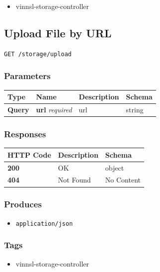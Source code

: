 \begin{itemize}
\tightlist
\item
  vinnsl-storage-controller
\end{itemize}

\subsection{Upload File by URL}\label{upload-file-by-url}

\begin{verbatim}
GET /storage/upload
\end{verbatim}

\subsubsection{Parameters}\label{parameters-19}

\begin{longtable}[]{@{}llll@{}}
\toprule
Type & Name & Description & Schema\tabularnewline
\midrule
\endhead
\textbf{Query} & \textbf{url} \emph{required} & url &
string\tabularnewline
\bottomrule
\end{longtable}

\subsubsection{Responses}\label{responses-22}

\begin{longtable}[]{@{}lll@{}}
\toprule
HTTP Code & Description & Schema\tabularnewline
\midrule
\endhead
\textbf{200} & OK & object\tabularnewline
\textbf{404} & Not Found & No Content\tabularnewline
\bottomrule
\end{longtable}

\subsubsection{Produces}\label{produces-22}

\begin{itemize}
\tightlist
\item
  \texttt{application/json}
\end{itemize}

\subsubsection{Tags}\label{tags-22}

\begin{itemize}
\tightlist
\item
  vinnsl-storage-controller
\end{itemize}

